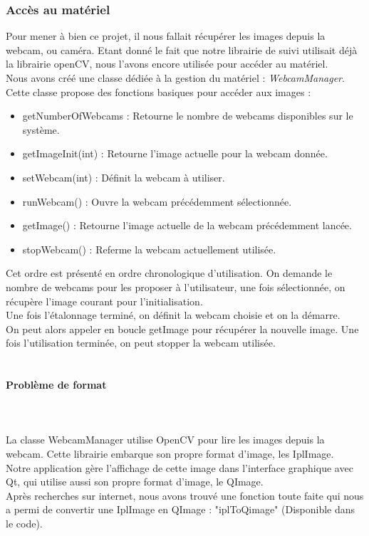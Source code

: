 \documentclass{report}
\begin{document}
			\subsubsection{Accès au matériel}
				Pour mener à bien ce projet, il nous fallait récupérer les images depuis la webcam, ou caméra. Etant donné le fait que notre librairie de suivi utilisait déjà la librairie openCV, nous l'avons encore utilisée pour accéder au matériel. \\
				Nous avons créé une classe dédiée à la gestion du matériel : \textit{WebcamManager}. Cette classe propose des fonctions basiques pour accéder aux images : \\
				\begin{itemize}
					\item getNumberOfWebcams : Retourne le nombre de webcams disponibles sur le système.\\
					\item getImageInit(int) : Retourne l'image actuelle pour la webcam donnée.\\
					\item setWebcam(int) : Définit la webcam à utiliser.\\
					\item runWebcam() : Ouvre la webcam précédemment sélectionnée.\\
					\item getImage() : Retourne l'image actuelle de la webcam précédemment lancée.\\
					\item stopWebcam() : Referme la webcam actuellement utilisée.\\
				\end{itemize}
				Cet ordre est présenté en ordre chronologique d'utilisation. On demande le nombre de webcams pour les proposer à l'utilisateur, une fois sélectionnée, on récupère l'image courant pour l'initialisation. \\
				Une fois l'étalonnage terminé, on définit la webcam choisie et on la démarre. \\
				On peut alors appeler en boucle getImage pour récupérer la nouvelle image. Une fois l'utilisation terminée, on peut stopper la webcam utilisée. \\
				$$$$ \\
				\paragraph{Problème de format}
				\ \\ \\
				La classe WebcamManager utilise OpenCV pour lire les images depuis la webcam. Cette librairie embarque son propre format d'image, les IplImage. \\
				Notre application gère l'affichage de cette image dans l'interface graphique avec Qt, qui utilise aussi son propre format d'image, le QImage. \\
				Après recherches sur internet, nous avons trouvé une fonction toute faite qui nous a permi de convertir une IplImage en QImage : "iplToQimage" (Disponible dans le code).
				
\end{document}
